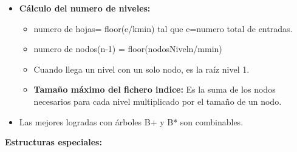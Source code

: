 \documentclass[12pt, twoside, openright]{report} %
\begin{document}
\begin{itemize}
\begin{itemize}
    \item \textbf{Cálculo del numero de niveles:}
      

      \begin{itemize}
      \item numero de hojas= floor(e/kmin) tal que e=numero total de
        entradas.
        
      \item numero de nodos(n-1) = floor(nodosNiveln/mmin)
        
      \item Cuando llega un nivel con un solo nodo, es la raíz nivel 1.
        
      \item \textbf{Tamaño máximo del fichero indice:} Es la suma de los
        nodos necesarios para cada nivel multiplicado por el tamaño de
        un nodo.
        
      \end{itemize}
    \item Las mejores logradas con árboles B+ y B* son combinables.
      
    \end{itemize}
  \end{itemize}

  
  \textbf{Estructuras especiales:}
  
\end{document}
